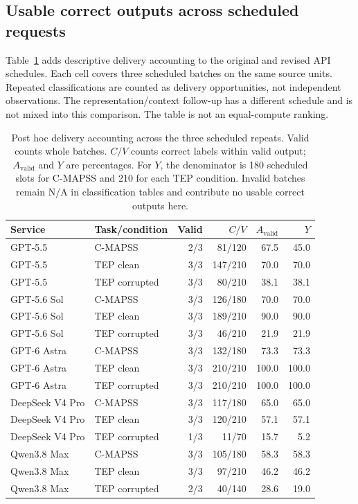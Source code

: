 \subsection{Usable correct outputs across scheduled requests}
Table~\ref{tab:usable} adds descriptive delivery accounting to the original and revised API schedules. Each cell covers three scheduled batches on the same source units. Repeated classifications are counted as delivery opportunities, not independent observations. The representation/context follow-up has a different schedule and is not mixed into this comparison. The table is not an equal-compute ranking.

\begin{table}[htbp]
\centering\small
\caption{Post hoc delivery accounting across the three scheduled repeats. Valid counts whole batches. $C/V$ counts correct labels within valid output; $A_{\mathrm{valid}}$ and $Y$ are percentages. For $Y$, the denominator is 180 scheduled slots for C-MAPSS and 210 for each TEP condition. Invalid batches remain N/A in classification tables and contribute no usable correct outputs here.}
\label{tab:usable}
\begin{tabular}{@{}llrrrr@{}}
\toprule
Service & Task/condition & Valid & $C/V$ & $A_{\mathrm{valid}}$ & $Y$ \\
\midrule
GPT-5.5 & C-MAPSS & 2/3 & 81/120 & 67.5 & 45.0 \\
GPT-5.5 & TEP clean & 3/3 & 147/210 & 70.0 & 70.0 \\
GPT-5.5 & TEP corrupted & 3/3 & 80/210 & 38.1 & 38.1 \\
GPT-5.6 Sol & C-MAPSS & 3/3 & 126/180 & 70.0 & 70.0 \\
GPT-5.6 Sol & TEP clean & 3/3 & 189/210 & 90.0 & 90.0 \\
GPT-5.6 Sol & TEP corrupted & 3/3 & 46/210 & 21.9 & 21.9 \\
GPT-6 Astra & C-MAPSS & 3/3 & 132/180 & 73.3 & 73.3 \\
GPT-6 Astra & TEP clean & 3/3 & 210/210 & 100.0 & 100.0 \\
GPT-6 Astra & TEP corrupted & 3/3 & 210/210 & 100.0 & 100.0 \\
DeepSeek V4 Pro & C-MAPSS & 3/3 & 117/180 & 65.0 & 65.0 \\
DeepSeek V4 Pro & TEP clean & 3/3 & 120/210 & 57.1 & 57.1 \\
DeepSeek V4 Pro & TEP corrupted & 1/3 & 11/70 & 15.7 & 5.2 \\
Qwen3.8 Max & C-MAPSS & 3/3 & 105/180 & 58.3 & 58.3 \\
Qwen3.8 Max & TEP clean & 3/3 & 97/210 & 46.2 & 46.2 \\
Qwen3.8 Max & TEP corrupted & 2/3 & 40/140 & 28.6 & 19.0 \\
\bottomrule
\end{tabular}
\end{table}


